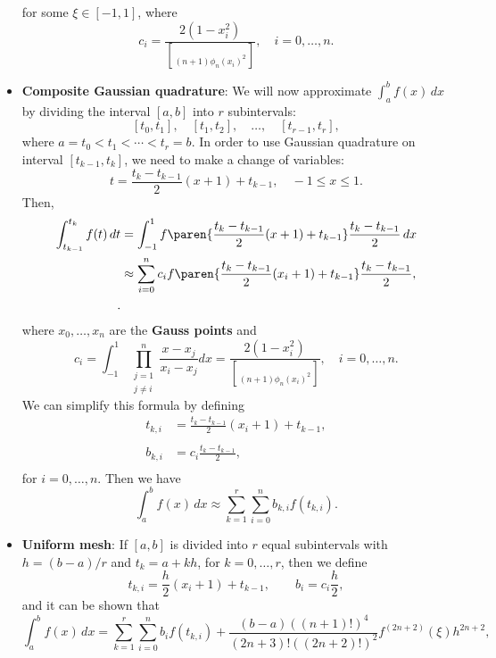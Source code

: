 \documentclass{report}
\begin{document}
\begin{itemize}
            for some $\xi \in [-1,1]$, where
            $$ c_i = \frac{2(1 - x_i^2)}{\brack{(n+1)\phi_n(x_i)}^2}, \quad i=0,\ldots,n. $$
        \item \textbf{Composite Gaussian quadrature}:
            We will now approximate $\int_a^b f(x)\,dx$ by dividing the interval $[a,b]$ into $r$  subintervals:
            $$[t_0,t_1], \quad [t_1,t_2], \quad \ldots, \quad [t_{r-1},t_r],$$
            where $a = t_0 < t_1 < \cdots < t_r = b$.
            \bigbreak \noindent 
            In order to use Gaussian quadrature on interval $[t_{k-1},t_k]$, we need to make a change of variables:
            $$ t = \frac{t_k - t_{k-1}}{2} (x + 1) + t_{k-1}, \quad -1 \leq x \leq 1. $$
            Then,
            \begin{align*}
                \int_{t_{k-1}}^{t_k} f(t)\,dt 
&= \int_{-1}^1 f\paren{\frac{t_k - t_{k-1}}{2} (x + 1) + t_{k-1}} \frac{t_k - t_{k-1}}{2}\,dx \\
&\approx \sum_{i=0}^n c_i f\paren{\frac{t_k - t_{k-1}}{2} (x_i + 1) + t_{k-1}} \frac{t_k - t_{k-1}}{2},\\
            .\end{align*}
            where $x_0,\ldots,x_n$ are the \textbf{Gauss points} and 
            $$c_i = \int_{-1}^1 \prod_{\substack{j = 1 \\ j \neq i}}^n \frac{x - x_j}{x_i - x_j} dx = \frac{2(1 - x_i^2)}{\brack{(n+1)\phi_n(x_i)}^2}, \quad i = 0,\ldots,n.$$
            \bigbreak \noindent 
            We can simplify this formula by defining
            \begin{align*}
                t_{k,i} &= \frac{t_k - t_{k-1}}{2} (x_i + 1) + t_{k-1}, \\
                \\
                b_{k,i} &= c_i \frac{t_k - t_{k-1}}{2}, \\
            \end{align*}
            for $i = 0,\ldots,n$.
            \bigbreak \noindent 
            Then we have
            $$\int_a^b f(x)\, dx \approx \sum_{k=1}^r \sum_{i=0}^n b_{k,i} f(t_{k,i}).$$
        \item \textbf{Uniform mesh}: 
            If $[a,b]$ is divided into $r$ equal subintervals with $h = (b - a)/r$ and $t_k = a + kh$, for $k = 0, \ldots, r$, then we define
            $$
            t_{k,i} = \frac{h}{2} (x_i + 1) + t_{k-1}, \qquad b_i = c_i \frac{h}{2},
            $$
            and it can be shown that 
            $$\int_a^b f(x)\, dx = \sum_{k=1}^r \sum_{i=0}^n b_i f(t_{k,i}) + \frac{(b - a)((n+1)!)^4}{(2n+3)!((2n+2)!)^2} f^{(2n+2)}(\xi) h^{2n+2},$$

\end{itemize}
\end{document}
